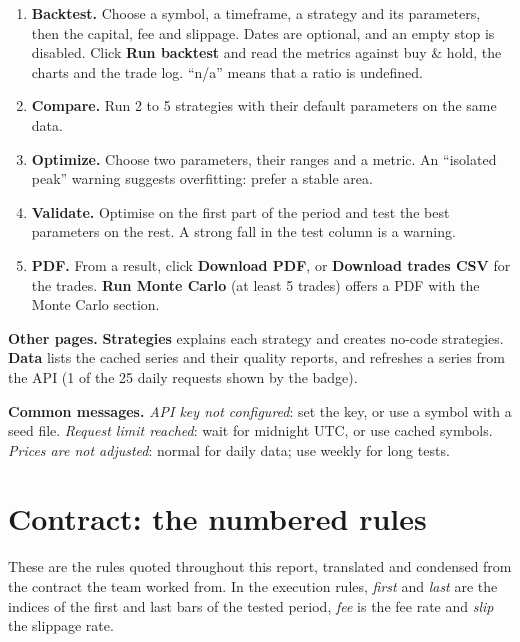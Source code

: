 \documentclass[11pt,a4paper]{article}
\begin{document}
\begin{enumerate}
\item \textbf{Backtest.} Choose a symbol, a timeframe, a strategy and its parameters, then the capital, fee and slippage. Dates are optional, and an empty stop is disabled. Click \textbf{Run backtest} and read the metrics against buy \& hold, the charts and the trade log. ``n/a'' means that a ratio is undefined.
\item \textbf{Compare.} Run 2 to 5 strategies with their default parameters on the same data.
\item \textbf{Optimize.} Choose two parameters, their ranges and a metric. An ``isolated peak'' warning suggests overfitting: prefer a stable area.
\item \textbf{Validate.} Optimise on the first part of the period and test the best parameters on the rest. A strong fall in the test column is a warning.
\item \textbf{PDF.} From a result, click \textbf{Download PDF}, or \textbf{Download trades CSV} for the trades. \textbf{Run Monte Carlo} (at least 5 trades) offers a PDF with the Monte Carlo section.
\end{enumerate}

\textbf{Other pages.} \textbf{Strategies} explains each strategy and creates no-code strategies. \textbf{Data} lists the cached series and their quality reports, and refreshes a series from the API (1 of the 25 daily requests shown by the badge).

\textbf{Common messages.} \emph{API key not configured}: set the key, or use a symbol with a seed file. \emph{Request limit reached}: wait for midnight UTC, or use cached symbols. \emph{Prices are not adjusted}: normal for daily data; use weekly for long tests.

\clearpage
\section{Contract: the numbered rules}
\label{app:contract}

These are the rules quoted throughout this report, translated and condensed from the contract the team worked from. In the execution rules, \textit{first} and \textit{last} are the indices of the first and last bars of the tested period, \textit{fee} is the fee rate and \textit{slip} the slippage rate.

\footnotesize
\setlength{\LTpre}{4pt}
\setlength{\LTpost}{6pt}
\end{document}

